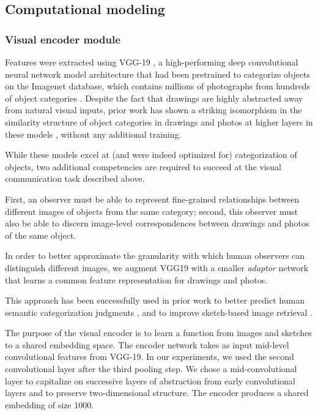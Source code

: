 \documentclass[9pt,twocolumn,twoside]{pnas-new}
\begin{document}
{%

\subsection*{Computational modeling}


\subsubsection*{Visual encoder module}

Features were extracted using VGG-19 \cite{simonyan2014very}, a high-performing deep convolutional neural network model architecture that had been pretrained to categorize objects on the Imagenet database, which contains millions of photographs from hundreds of object categories \cite{deng2009imagenet}. Despite the fact that drawings are highly abstracted away from natural visual inputs, prior work has shown a striking isomorphism in the similarity structure \cite{kriegeskorte2008matching} of object categories in drawings and photos at higher layers in these models \cite{fan2015common}, without any additional training.

While these models excel at (and were indeed optimized for) categorization of objects, two additional competencies are required to succeed at the visual communication task described above.

First, an observer must be able to represent fine-grained relationships between different images of objects from the same category; second, this observer must also be able to discern image-level correspondences between drawings and photos of the same object.

In order to better approximate the granularity with which human observers can distinguish different images, we augment VGG19 with a smaller \textit{adaptor} network that learns a common feature representation for drawings and photos.

This approach has been successfully used in prior work to better predict human semantic categorization judgments \cite[]{peterson2016adapting}, and to improve sketch-based image retrieval \cite[]{sangkloy2016sketchy}.

The purpose of the visual encoder is to learn a function from images and sketches to a shared embedding space. The encoder network takes as input mid-level convolutional features from VGG-19. In our experiments, we used the second convolutional layer after the third pooling step. We chose a mid-convolutional layer to capitalize on successive layers of abstraction from early convolutional layers and to preserve two-dimensional structure. The encoder produces a shared embedding of size 1000.

}
\end{document}

